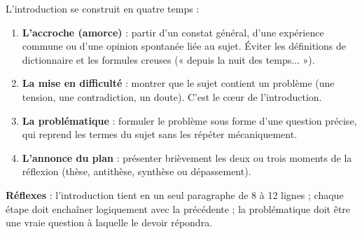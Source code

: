 \documentclass[11pt]{article}
\begin{document}
\begin{methode}
L'introduction se construit en quatre temps :
\begin{enumerate}
\item \textbf{L'accroche (amorce)} : partir d'un constat général, d'une expérience commune ou d'une opinion spontanée liée au sujet. Éviter les définitions de dictionnaire et les formules creuses (« depuis la nuit des temps... »).
\item \textbf{La mise en difficulté} : montrer que le sujet contient un problème (une tension, une contradiction, un doute). C'est le cœur de l'introduction.
\item \textbf{La problématique} : formuler le problème sous forme d'une question précise, qui reprend les termes du sujet sans les répéter mécaniquement.
\item \textbf{L'annonce du plan} : présenter brièvement les deux ou trois moments de la réflexion (thèse, antithèse, synthèse ou dépassement).
\end{enumerate}
\textbf{Réflexes} : l'introduction tient en un seul paragraphe de 8 à 12 lignes ; chaque étape doit enchaîner logiquement avec la précédente ; la problématique doit être une vraie question à laquelle le devoir répondra.
\end{methode}
\end{document}
